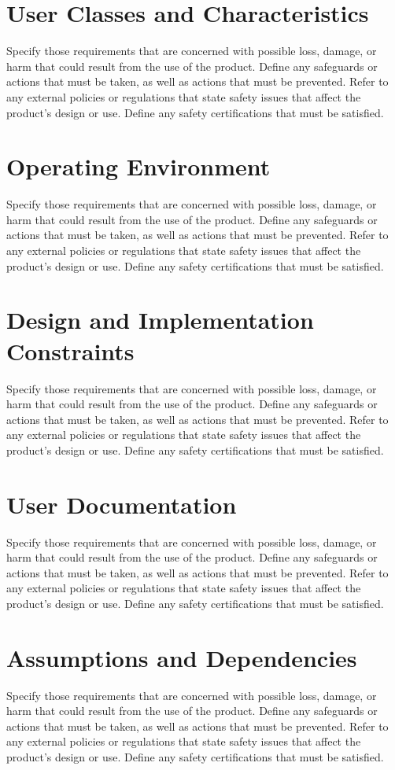 \documentclass{scrreprt}
\begin{document}
    \section{User Classes and Characteristics}
    Specify those requirements that are concerned with possible loss, damage, or harm that could result from the use of the product. Define any safeguards or actions that must be taken, as well as actions that must be prevented. Refer to any external policies or regulations that state safety issues that affect the product’s design or use. Define any safety certifications that must be satisfied.
    \section{Operating Environment}
    Specify those requirements that are concerned with possible loss, damage, or harm that could result from the use of the product. Define any safeguards or actions that must be taken, as well as actions that must be prevented. Refer to any external policies or regulations that state safety issues that affect the product’s design or use. Define any safety certifications that must be satisfied.
    \section{Design and Implementation Constraints}
    Specify those requirements that are concerned with possible loss, damage, or harm that could result from the use of the product. Define any safeguards or actions that must be taken, as well as actions that must be prevented. Refer to any external policies or regulations that state safety issues that affect the product’s design or use. Define any safety certifications that must be satisfied.
    \section{User Documentation}
    Specify those requirements that are concerned with possible loss, damage, or harm that could result from the use of the product. Define any safeguards or actions that must be taken, as well as actions that must be prevented. Refer to any external policies or regulations that state safety issues that affect the product’s design or use. Define any safety certifications that must be satisfied.
    \section{Assumptions and Dependencies}
    Specify those requirements that are concerned with possible loss, damage, or harm that could result from the use of the product. Define any safeguards or actions that must be taken, as well as actions that must be prevented. Refer to any external policies or regulations that state safety issues that affect the product’s design or use. Define any safety certifications that must be satisfied.
     
\end{document}
